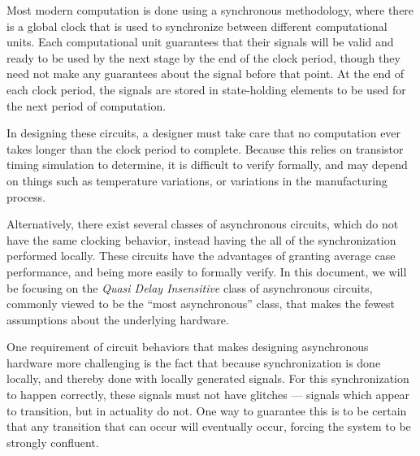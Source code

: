 \documentclass[times, 10pt]{article}
\begin{document}
Most modern computation is done using a synchronous methodology, where there is
a global clock that is used to synchronize between different computational
units.  Each computational unit guarantees that their signals will be valid and
ready to be used by the next stage by the end of the clock period, though they
need not make any guarantees about the signal before that point.  At the end of
each clock period, the signals are stored in state-holding elements to be used
for the next period of computation. 

In designing these circuits, a designer must take care that no computation ever
takes longer than the clock period to complete. Because this relies on
transistor timing simulation to determine, it is difficult to verify formally,
and may depend on things such as temperature variations, or variations in the
manufacturing process.


Alternatively, there exist several classes of asynchronous circuits, which
do not have the same clocking behavior, instead having the all of the
synchronization performed locally. These circuits have the advantages of
granting average case performance, and being more easily to formally verify. In
this document, we will be focusing on the \emph{Quasi Delay Insensitive} class of
asynchronous circuits, commonly viewed to be the ``most asynchronous'' class,
that makes the fewest assumptions about the underlying hardware.

One requirement of circuit behaviors that makes designing asynchronous hardware
more challenging is the fact that because synchronization is done locally, and
thereby done with locally generated signals. For this synchronization to happen
correctly, these signals must not have glitches --- signals which appear
to transition, but in actuality do not. One way to guarantee this is to be
certain that any transition that can occur will eventually occur, forcing the
system to be strongly confluent.
\end{document}
